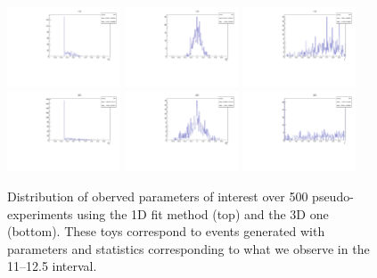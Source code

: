%
\begin{figure}[h]
\centering
\includegraphics[width=0.3\textwidth]{Lmumu/figs/toys3D/B2/1D/toys3D_afbB.pdf}
\includegraphics[width=0.3\textwidth]{Lmumu/figs/toys3D/B2/1D/toys3D_afb.pdf}
\includegraphics[width=0.3\textwidth]{Lmumu/figs/toys3D/B2/1D/toys3D_fL.pdf} \\
\includegraphics[width=0.3\textwidth]{Lmumu/figs/toys3D/B2/3D/toys3D_afbB.pdf}
\includegraphics[width=0.3\textwidth]{Lmumu/figs/toys3D/B2/3D/toys3D_afb.pdf}
\includegraphics[width=0.3\textwidth]{Lmumu/figs/toys3D/B2/3D/toys3D_fL.pdf} \\
\caption{Distribution of oberved parameters of interest over 500 pseudo-experiments using the 1D fit
method (top) and the 3D one (bottom). These toys correspond to events generated with parameters
and statistics corresponding to what we observe in the 11--12.5 \qsq interval. }
\label{fig:3DtoyResults_lowest_stats}
\end{figure}
